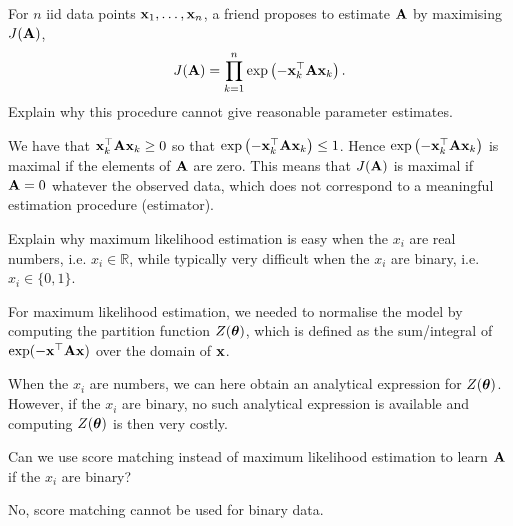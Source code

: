 \begin{exenumerate}
\item For $n$ iid data points $\mathbf{x}_1, \ldots, \mathbf{x}_n$, a friend
  proposes to estimate $\mathbf{A}$ by maximising $J(\mathbf{A})$,
  \begin{equation}
    J(\mathbf{A}) = \prod_{k=1}^n \exp\left( - \mathbf{x}_k^\top \mathbf{A} \mathbf{x}_k \right).
  \end{equation}
  Explain why this procedure cannot give reasonable parameter estimates. 

  \begin{solution}
    We have that $\mathbf{x}_k^\top \mathbf{A} \mathbf{x}_k \ge 0$ so that $\exp\left( -
    \mathbf{x}_k^\top \mathbf{A} \mathbf{x}_k \right) \le 1$. Hence $\exp\left( - \mathbf{x}_k^\top \mathbf{A}
    \mathbf{x}_k \right)$ is maximal if the elements of $\mathbf{A}$ are zero. This
    means that $J(\mathbf{A})$ is maximal if $\mathbf{A} = 0$ whatever the observed
    data, which does not correspond to a meaningful estimation
    procedure (estimator).
    
  \end{solution}
  
\item Explain why maximum likelihood estimation is easy when the $x_i$
  are real numbers, i.e. $x_i \in \mathbb{R}$, while typically very
  difficult when the $x_i$ are binary, i.e.\ $x_i \in \{0,1\}$.

  \begin{solution}

    For maximum likelihood estimation, we needed to normalise the
    model by computing the partition function $Z(\boldsymbol{\theta})$, which is
    defined as the sum/integral of $\exp(-\mathbf{x}^\top \mathbf{A} \mathbf{x})$ over the
    domain of $\mathbf{x}$.

    When the $x_i$ are numbers, we can here obtain an analytical
    expression for $Z(\boldsymbol{\theta})$.  However, if the $x_i$ are binary, no
    such analytical expression is available and computing $Z(\boldsymbol{\theta})$
    is then very costly.
    
  \end{solution}
  
\item Can we use score matching instead of maximum likelihood
  estimation to learn $\mathbf{A}$ if the $x_i$ are binary?
  
  \begin{solution}
    No, score matching cannot be used for binary data.
  \end{solution}
  
  
\end{exenumerate}

